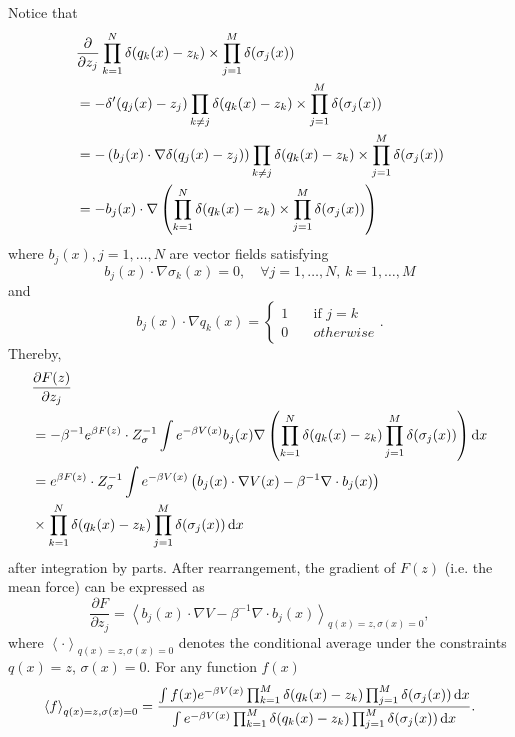 Notice that
\begin{align}
    &\frac{\partial}{\partial z_j}\prod_{k=1}^{N}\delta(q_k(x)-z_k)\times \prod_{j=1}^M\delta(\sigma_j(x))\notag\\
    &=-\delta^{\prime}(q_j(x)-z_j)\prod_{k\neq j}\delta(q_k(x)-z_k)\times \prod_{j=1}^M\delta(\sigma_j(x))\notag\\
    &=-\left(b_j(x)\cdot\nabla \delta(q_j(x)-z_j)\right)\prod_{k\neq j}\delta(q_k(x)-z_k)\times \prod_{j=1}^M\delta(\sigma_j(x))\notag\\
    &=-b_j(x)\cdot \nabla\left(\prod_{k=1}^{N}\delta(q_k(x)-z_k)\times \prod_{j=1}^M\delta(\sigma_j(x))\right)
\end{align}
where $b_j(x), j=1,\dots,N$ are vector fields satisfying
\begin{equation}
	b_j(x)\cdot \nabla \sigma_k(x)=0,\quad \forall j=1,\dots,N,\, k=1,\dots,M
\end{equation}
and
\begin{equation}
	b_j(x)\cdot \nabla q_k(x)=\begin{cases}
		1\quad &\text{if } j=k\\
		0\quad &otherwise
	\end{cases}.
\end{equation}
Thereby,
\begin{align}
    &\frac{\partial F(z)}{\partial z_j}\notag\\
    &=-\beta^{-1}e^{\beta F(z)}\cdot Z_\sigma^{-1} \int e^{-\beta V(x)}b_j(x)\nabla\left(\prod_{k=1}^{N}\delta(q_k(x)-z_k)\prod_{j=1}^M\delta(\sigma_j(x))\right)\mathop{}\!\mathrm{d} x\notag\\
    &=e^{\beta F(z)}\cdot Z_\sigma^{-1} \int e^{-\beta V(x)} \left(b_j(x)\cdot \nabla V(x)-\beta^{-1}\nabla\cdot b_j(x)\right)\notag\\
    &\times \prod_{k=1}^{N}\delta(q_k(x)-z_k)\prod_{j=1}^M\delta(\sigma_j(x))\mathop{}\!\mathrm{d} x
\end{align}
after integration by parts. After rearrangement, the gradient of $F(z)$ (i.e. the mean force) can be expressed as
\begin{equation}
	\frac{\partial F}{\partial z_j}=\left< b_j(x)\cdot \nabla V-\beta^{-1}\nabla\cdot b_j(x)\right>_{q(x)=z,\sigma(x)=0},
	\label{eq:FEM:ABF:meanforce}
\end{equation}
where $\left<\cdot\right>_{q(x)=z,\sigma(x)=0}$ denotes the conditional average under the constraints $q(x)=z$, $\sigma(x)=0$. For any function $f(x)$
\begin{equation}
	\left<f\right>_{q(x)=z,\sigma(x)=0}=\frac{\int f(x)e^{-\beta V(x)}\prod_{k=1}^{M}\delta(q_k(x)-z_k)\prod_{j=1}^M\delta(\sigma_j(x))\mathop{}\!\mathrm{d} x}{\int e^{-\beta V(x)}\prod_{k=1}^{M}\delta(q_k(x)-z_k)\prod_{j=1}^M\delta(\sigma_j(x))\mathop{}\!\mathrm{d} x}.
	\label{eq:FEM:ABF:expectation}
\end{equation}

